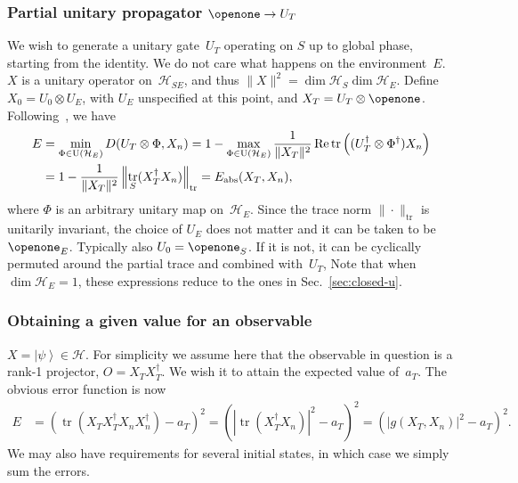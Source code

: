 \documentclass[aps, pra, a4paper, longbibliography, superscriptaddress]{revtex4-1}
\newcommand{\I}{\openone}
\newcommand{\ket}[1]{\left| #1 \right \rangle}
\newcommand{\hilb}[1]{\mathcal{#1}}
\DeclareMathOperator{\tr}{tr}
\DeclareMathOperator{\re}{Re}
\newcommand{\Xt}{X_T}  %
\newcommand{\Xo}{X_0}  %
\newcommand{\Xn}{X_n}  %
\begin{document}
\subsubsection{Partial unitary propagator $\I \to U_T$}
\label{sec:partU}

We wish to generate a unitary gate~$U_T$ operating on $S$ up to global
phase, starting from the identity.
We do not care what happens on the environment~$E$.
$X$ is a unitary operator on~$\hilb{H}_{SE}$, and
thus $\|X\|^2 = \dim \hilb{H}_S \dim \hilb{H}_E$.
Define $\Xo = U_0 \otimes U_E$, with $U_E$ unspecified at this point,
and $\Xt = U_T \otimes \I$.
Following~\cite{kosut_2006,floether_2012}, we have
\begin{align}
\notag
E
&= \min_{\Phi \in \text{U}(\hilb{H}_E)} D(U_T \otimes \Phi, \Xn)
= 1 -\max_{\Phi \in \text{U}(\hilb{H}_E)} \frac{1}{\|\Xt\|^2} \re \tr\left((U_T^\dagger \otimes \Phi^\dagger) \Xn\right)\\
&= 1 -\frac{1}{\|\Xt\|^2} \left\|\tr_S(\Xt^\dagger \Xn)\right\|_{\tr}
= E_\text{abs}(\Xt, \Xn),
\end{align}
where
$\Phi$ is an arbitrary unitary map on~$\hilb{H}_E$.
Since the trace norm $\|\cdot\|_{\tr}$ is unitarily invariant, the
choice of $U_E$ does not matter and it can be taken to be~$\I_E$.
Typically also $U_0 = \I_S$.
If it is not, it can be cyclically permuted around the partial trace and combined with~$U_T$,
Note that when $\dim \hilb{H}_E = 1$, these expressions reduce to the ones in Sec.~\ref{sec:closed-u}.


\subsubsection{Obtaining a given value for an observable}

$X = \ket{\psi} \in \hilb{H}$.
For simplicity we assume here that the observable in question is a rank-1 projector,
$O = \Xt \Xt^\dagger$. We wish it to attain the expected value of~$a_T$. The obvious error function is now
\begin{align}
E
&=
\left(\tr\left(\Xt \Xt^\dagger \Xn \Xn^\dagger \right) -a_T \right)^2
= \left(\left|\tr(\Xt^\dagger \Xn)\right|^2 -a_T \right)^2
= \left(\left|g(\Xt, \Xn)\right|^2 -a_T \right)^2.
\end{align}
We may also have requirements for several initial states, in which case we simply sum the errors.
\end{document}
